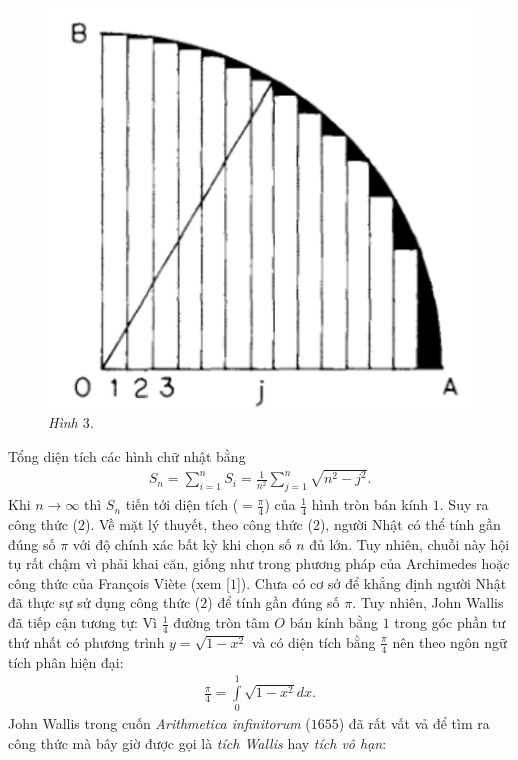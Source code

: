 \begin{multicols}{2}
\begin{figure}[H]
		\includegraphics[width= 1\linewidth]{3}
		\caption{\small\textit{\color{lichsutoanhoc}Hình $3$.}}
		\vspace*{-10pt}
	\end{figure}
	Tổng diện tích các hình chữ nhật bằng 
	\begin{align*}
		{S_n} = \sum\limits_{i = 1}^n {{S_i} = } \frac{1}{{{n^2}}}\sum\limits_{j = 1}^n {\sqrt {{n^2} - {j^2}} }.
	\end{align*}
	Khi $n \to \infty$ thì $S_n$ tiến tới diện tích ($= \frac{\pi}{4}$) của $\frac{1}{4}$ hình tròn bán kính $1$.  Suy ra công thức ($2$).
	\vskip 0.1cm
	Về mặt lý thuyết, theo công thức ($2$), người Nhật có thể tính gần đúng số $\pi$ với độ chính xác bất kỳ khi chọn số $n$ đủ lớn. Tuy nhiên, chuỗi này hội tụ rất chậm vì phải khai căn, giống như trong phương pháp của Archimedes hoặc công thức của François Viète (xem [$1$]).
	\vskip 0.1cm
	Chưa có cơ sở để khẳng định người Nhật đã thực sự sử dụng công thức ($2$) để tính gần đúng số $\pi$. Tuy nhiên, John Wallis đã tiếp cận tương tự: Vì $\frac{1}{4}$ đường tròn tâm $O$ bán kính bằng $1$ trong góc phần tư thứ nhất có phương trình $y = \sqrt{1- x^2}$ và có diện tích bằng $\frac{\pi}{4}$ nên theo ngôn ngữ tích phân hiện đại:  
	\begin{align*}
		\frac{\pi }{4} = \int\limits_0^1 {\sqrt {1 - {x^2}} dx} .
	\end{align*}   
	John Wallis trong cuốn \textit{Arithmetica infinitorum} ($1655$) đã rất vất vả để tìm ra công thức mà bây giờ được gọi là \textit{tích Wallis} hay \textit{tích vô hạn}:

\end{multicols}
